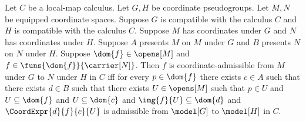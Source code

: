 \begin{theorem}\label{coordinate_admissible_presentations}
    Let $C$ be a local-map calculus.
    Let $G,H$ be coordinate pseudogroups.
    Let $M,N$ be equipped coordinate spaces.
    Suppose $G$ is compatible with the calculus $C$ and $H$ is compatible with the calculus $C$.
    Suppose $M$ has coordinates under $G$ and $N$ has coordinates under $H$.
    Suppose $A$ presents $M$ on $M$ under $G$ and $B$ presents $N$ on $N$ under $H$.
    Suppose $\dom{f}\in\opens[M]$ and $f\in\funs{\dom{f}}{\carrier[N]}$.
    Then $f$ is coordinate-admissible from $M$ under $G$ to $N$ under $H$ in $C$ iff
        for every $p\in\dom{f}$ there exists $c\in A$ such that there exists $d\in B$
            such that there exists $U\in\opens[M]$ such that
                $p\in U$ and $U\subseteq\dom{f}$ and $U\subseteq\dom{c}$ and
                $\img{f}{U}\subseteq\dom{d}$ and
                $\CoordExpr{d}{f}{c}{U}$ is admissible from $\model[G]$ to $\model[H]$ in $C$.
\end{theorem}
